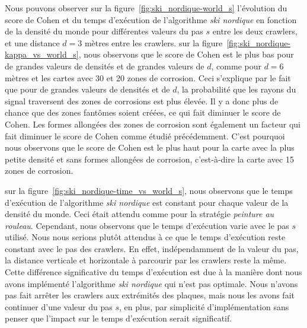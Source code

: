 \documentclass[francais,RandD]{rapportPFE}
\begin{document}
			Nous pouvons observer sur la figure~\ref{fig:ski_nordique-world_s} l'évolution du score de Cohen et du temps d'exécution de l'algorithme \textit{ski nordique} en fonction de la densité du monde pour différentes valeurs du pas $s$ entre les deux crawlers, et une distance $d = 3$ mètres entre les crawlers.
			sur la figure~\ref{fig:ski_nordique-kappa_vs_world_s}, nous observons que le score de Cohen est le plus bas pour de grandes valeurs de densités et de grandes valeurs de $d$, comme pour $d = 6$ mètres et les cartes avec 30 et 20 zones de corrosion.
			Ceci s'explique par le fait que pour de grandes valeurs de densités et de $d$, la probabilité que les rayons du signal traversent des zones de corrosions est plus élevée.
			Il y a donc plus de chance que des zones fantômes soient créées, ce qui fait diminuer le score de Cohen.
			Les formes allongées des zones de corrosion sont également un facteur qui fait diminuer le score de Cohen comme étudié précédemment.
			C'est pourquoi nous observons que le score de Cohen est le plus haut pour la carte avec la plus petite densité et sans formes allongées de corrosion, c'est-à-dire la carte avec 15 zones de corrosion.

			sur la figure~\ref{fig:ski_nordique-time_vs_world_s}, nous observons que le temps d'exécution de l'algorithme \textit{ski nordique} est constant pour chaque valeur de la densité du monde.
			Ceci était attendu comme pour la stratégie \textit{peinture au rouleau}.
			Cependant, nous observons que le temps d'exécution varie avec le pas $s$ utilisé.
			Nous nous serions plutôt attendus à ce que le temps d'exécution reste constant avec le pas des crawlers.
			En effet, indépendamment de la valeur du pas, la distance verticale et horizontale à parcourir par les crawlers reste la même.
			Cette différence significative du temps d'exécution est due à la manière dont nous avons implémenté l'algorithme \textit{ski nordique} qui n'est pas optimale.
			Nous n'avons pas fait arrêter les crawlers aux extrémités des plaques, mais nous les avons fait continuer d'une valeur du pas $s$, en plus, par simplicité d'implémentation sans penser que l'impact sur le temps d'exécution serait significatif.
\end{document}
